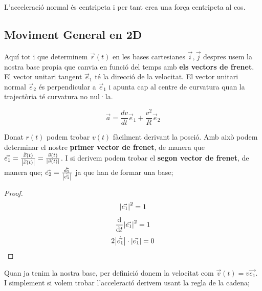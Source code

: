\documentclass[12pt]{article}
\begin{document}
L'acceleració normal és centripeta i per tant crea una força centripeta al cos.

\subsection{Moviment General en 2D}

Aquí tot i que determinem $\vec{r}(t)$ en les bases cartesianes $\vec{i}, \vec{j}$ despres usem la nostra base propia que canvia en funció del temps amb \textbf{els vectors de frenet}. El vector unitari tangent $\vec e_1$ té la direcció de la velocitat. El vector unitari normal $\vec e_2$ és perpendicular a $\vec e_1$ i apunta cap al centre de curvatura quan la trajectòria té curvatura no nul·la.

\[
\vec a=\frac{dv}{dt}\vec e_1+\frac{v^2}{R}\vec e_2
\]

Donat $r(t)$ podem trobar $v(t)$ fàcilment derivant la posció. Amb això podem determinar el nostre \textbf{primer vector de frenet}, de manera que $\vec{e_1} = \frac{\dot{\vec{x}}(t)}{\abs{\dot{\vec{x}}(t)}} = \frac{\vec{v}(t)}{\abs{\vec{v}(t)}}$. I si derivem podem trobar el \textbf{segon vector de frenet}, de manera que; $\vec{e_2} = \frac{\dot{\vec{e_1}}}{\abs{\dot{\vec{e_1}}}}$ ja que han de formar una base;

\begin{center}
\end{center}

\begin{proof}
    \[\abs{\vec{e_1}}^2 = 1\]
    \[\dv{}{t}\abs{\vec{e_1}}^2 = 1  \]
    \[2 \abs{\dot{\vec{e_1}}} \cdot \abs{\vec{e_1}} = 0\]
\end{proof}

Quan ja tenim la nostra base, per definició donem la velocitat com $\vec{v}(t) = v\vec{e_1}$. I simplement si volem trobar l'acceleració derivem usant la regla de la cadena;
\end{document}
